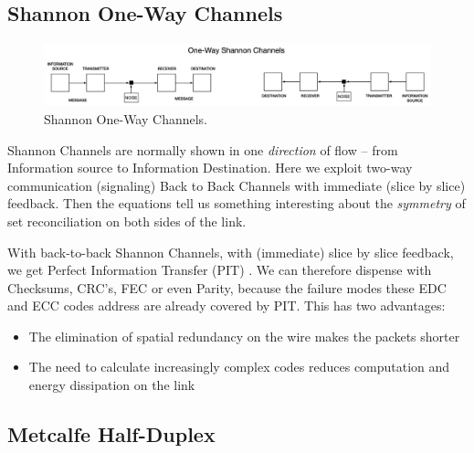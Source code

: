 \documentclass[../HFT-main.tex]{subfiles}
\begin{document}
\subsection{Shannon One-Way Channels}

\begin{figure}
\includegraphics[width=\textwidth]{../figures/One-Way-Shannon.png}
  \caption{Shannon One-Way Channels. }
\end{figure}

Shannon Channels are normally shown in one \emph{direction} of flow -- from Information source to Information Destination. Here we exploit two-way communication (signaling) Back to Back Channels with immediate (slice by slice) feedback. Then the equations tell us something interesting about the \emph{symmetry} of set reconciliation on both sides of the link.

With back-to-back Shannon Channels, with (immediate) slice by slice feedback, we get Perfect Information Transfer (PIT) \cite{soltted-aloha}. We can therefore dispense with Checksums, CRC's, FEC or even Parity,  because the failure modes these EDC and ECC codes address are already covered by PIT.  This has two advantages:

\begin{itemize}
\item The elimination of spatial redundancy on the wire makes the packets shorter
\item The need to calculate increasingly complex codes reduces computation and energy dissipation on the link
\end{itemize}


\bigskip \bigskip

\subsection{Metcalfe Half-Duplex}
\end{document}
